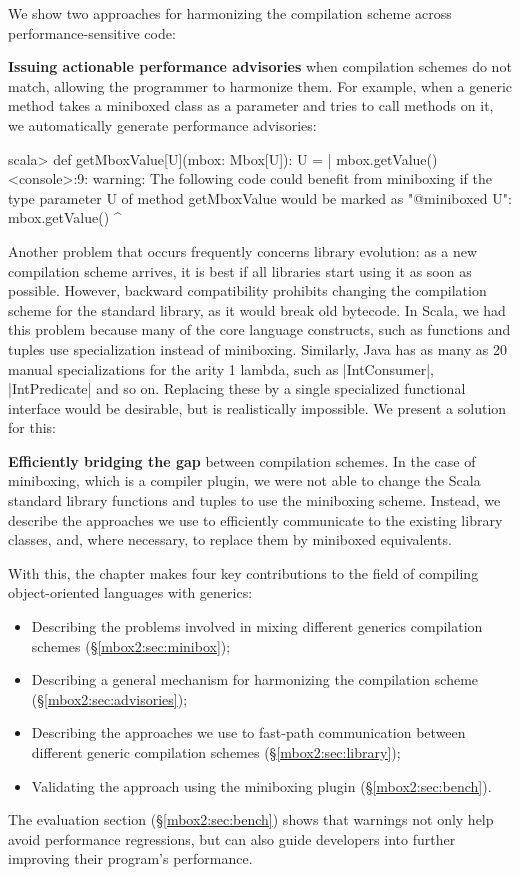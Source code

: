 We show two approaches for harmonizing the compilation scheme across performance-sensitive code:

\textbf{Issuing actionable performance advisories} when compilation schemes do not match, allowing the programmer to harmonize them. For example, when a generic method takes a miniboxed class as a parameter and tries to call methods on it, we automatically generate performance advisories:

\begin{lstlisting-nobreak-nolang}
scala> def getMboxValue[U](mbox: Mbox[U]): U =
     |      mbox.getValue()
<console>:9: warning: The following code could benefit from miniboxing if the type parameter U of method getMboxValue would be marked as "@miniboxed U":
         mbox.getValue()
               ^
\end{lstlisting-nobreak-nolang}

Another problem that occurs frequently concerns library evolution: as a new compilation scheme arrives, it is best if all libraries start using it as soon as possible. However, backward compatibility prohibits changing the compilation scheme for the standard library, as it would break old bytecode. In Scala, we had this problem because many of the core language constructs, such as functions and tuples use specialization instead of miniboxing. Similarly, Java has as many as 20 manual specializations for the arity 1 lambda, such as |IntConsumer|, |IntPredicate| and so on. Replacing these by a single specialized functional interface would be desirable, but is realistically impossible. We present a solution for this:

\textbf{Efficiently bridging the gap} between compilation schemes. In the case of miniboxing, which is a compiler plugin, we were not able to change the Scala standard library functions and tuples to use the miniboxing scheme. Instead, we describe the approaches we use to efficiently communicate to the existing library classes, and, where necessary, to replace them by miniboxed equivalents.

With this, the chapter makes four key contributions to the field of compiling object-oriented languages with generics:

\begin{itemize}
  \item Describing the problems involved in mixing different generics compilation schemes (\S\ref{mbox2:sec:minibox});
  \item Describing a general mechanism for harmonizing the compilation scheme (\S\ref{mbox2:sec:advisories});
  \item Describing the approaches we use to fast-path communication between different generic compilation schemes (\S\ref{mbox2:sec:library});
  \item Validating the approach using the miniboxing plugin (\S\ref{mbox2:sec:bench}).
\end{itemize}

The evaluation section (\S\ref{mbox2:sec:bench}) shows that warnings not only help avoid performance regressions, but can also guide developers into further improving their program's performance.